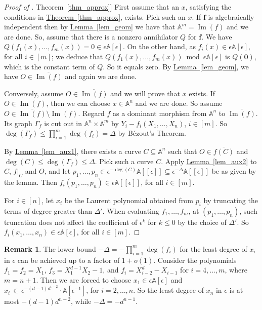 \documentclass[11pt]{article}
\numberwithin{equation}{section}
\theoremstyle{definition}
\newtheorem{remark}[theorem]{Remark}
\theoremstyle{plain}
\newcommand{\expref}[2]{\hyperref[#2]{#1~\ref{#2}}}
\newcommand{\aff}{\mathbb{A}}
\DeclareMathOperator{\im}{\mathrm{Im}}
\begin{document}
\begin{proof}[Proof of \expref{Theorem}{thm_approx}]
First assume that an $x$, satisfying the conditions in \expref{Theorem}{thm_approx}, exists. Pick such an $x$. If $\mathbf f$
%
is  %
algebraically independent then by \expref{Lemma}{lem_geom} we have that $\aff^m=\overline{\im(f)}$ and we are done. So, assume that there is a nonzero annihilator $Q$ for $\mathbf f$.
We have $Q(f_1(x),\dots,f_m(x))=0\in\epsilon \aff[\epsilon]$. On the other hand, as $f_i(x)\in \epsilon \aff[\epsilon]$, for all $i\in [m]$; we deduce that $Q(f_1(x),\dots,f_m(x))\bmod \epsilon \aff[\epsilon]$ is $Q(\mathbf 0)$, which is the constant term of $Q$. So it equals zero. By \expref{Lemma}{lem_geom}, we have $O\in \overline{\im(f)}$ and again we are done.

Conversely, assume $O\in \overline{\im(f)}$ and we will prove that $x$ exists.
If $O\in \im(f)$, then we can choose $x\in \aff^n$ and we are done. So assume $O\in  \overline{\im(f)}\setminus \im(f)$.
Regard $f$ as a dominant morphism from $\aff^n$ to $\overline{\im(f)}$. Its graph $\Gamma_f$ is cut out in $\aff^n\times \aff^m$ by $Y_i-f_i(X_1,\dots,X_n)$, $i\in[m]$. So $\deg(\Gamma_f)\leq \prod_{i=1}^m \deg(f_i) = \Delta$ by B\'ezout's Theorem.

By \expref{Lemma}{lem_aux1}, there exists a curve $C\subseteq \aff^n$ such that $O\in \overline{f(C)}$ and $\deg(C)\leq \deg(\Gamma_f)\leq \Delta$. Pick such a curve $C$. Apply \expref{Lemma}{lem_aux2} to $C$, $f|_C$ and $O$, and let $p_1,\dots,p_n\in \epsilon^{-\deg(C)} \aff[[\epsilon]]\subseteq \epsilon^{-\Delta} \aff[[\epsilon]]$ be as given by the lemma.
Then $f_i(p_1,\dots,p_n)\in \epsilon \aff[[\epsilon]]$, for all $i\in [m]$. 

For $i\in [n]$, let $x_i$ be the Laurent polynomial obtained from $p_i$ by truncating the terms of degree greater than $\Delta'$.
When evaluating $f_1,\dots,f_m$, at $(p_1,\dots,p_n)$, such truncation does not affect the coefficient of $\epsilon^k$ for $k\leq 0$ by the choice of $\Delta'$.
So $f_i(x_1,\dots,x_n)\in \epsilon \aff[\epsilon]$,  for all $i\in [m]$.
\end{proof}

\noindent

%
\begin{remark}   %
The lower bound $-\Delta=-\prod_{i=1}^m \deg(f_i)$ for the least degree of $x_i$ in $\epsilon$ can be achieved up to a  factor of $1+o(1)$. Consider the polynomials $f_1=f_2=X_1$, $f_3=X_1^{d-1}X_2-1$, and $f_i=X_{i-2}^d-X_{i-1}$ for $i=4,\dots,m$, where $m=n+1$. Then we are forced to choose $x_1\in  \epsilon \aff[\epsilon]$ and $x_i \,\in\, \epsilon^{-(d-1)d^{i-2}}\cdot\aff[\epsilon^{-1}] $, for $i=2,\dots, n$. So the least degree of $x_n$ in $\epsilon$  is at most $-(d-1)d^{n-2}$, while $-\Delta=-d^{n-1}$.
\end{remark}
\end{document}
